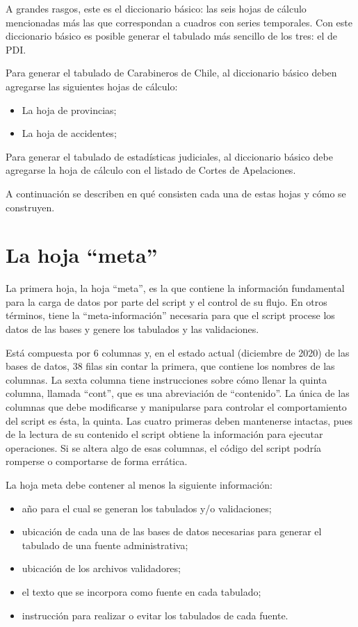 \documentclass[
  spanish,
]{book}
\begin{document}
A grandes rasgos, este es el diccionario básico: las seis hojas de cálculo mencionadas más las que correspondan a cuadros con series temporales. Con este diccionario básico es posible generar el tabulado más sencillo de los tres: el de PDI.

Para generar el tabulado de Carabineros de Chile, al diccionario básico deben agregarse las siguientes hojas de cálculo:

\begin{itemize}
\item
  La hoja de provincias;
\item
  La hoja de accidentes;
\end{itemize}

Para generar el tabulado de estadísticas judiciales, al diccionario básico debe agregarse la hoja de cálculo con el listado de Cortes de Apelaciones.

A continuación se describen en qué consisten cada una de estas hojas y cómo se construyen.

\hypertarget{la-hoja-meta}{%
\section{La hoja ``meta''}\label{la-hoja-meta}}

La primera hoja, la hoja ``meta'', es la que contiene la información fundamental para la carga de datos por parte del script y el control de su flujo. En otros términos, tiene la ``meta-información'' necesaria para que el script procese los datos de las bases y genere los tabulados y las validaciones.

Está compuesta por 6 columnas y, en el estado actual (diciembre de 2020) de las bases de datos, 38 filas sin contar la primera, que contiene los nombres de las columnas. La sexta columna tiene instrucciones sobre cómo llenar la quinta columna, llamada ``cont'', que es una abreviación de ``contenido''. La única de las columnas que debe modificarse y manipularse para controlar el comportamiento del script es ésta, la quinta. Las cuatro primeras deben mantenerse intactas, pues de la lectura de su contenido el script obtiene la información para ejecutar operaciones. Si se altera algo de esas columnas, el código del script podría romperse o comportarse de forma errática.

La hoja meta debe contener al menos la siguiente información:

\begin{itemize}
\item
  año para el cual se generan los tabulados y/o validaciones;
\item
  ubicación de cada una de las bases de datos necesarias para generar el tabulado de una fuente administrativa;
\item
  ubicación de los archivos validadores;
\item
  el texto que se incorpora como fuente en cada tabulado;
\item
  instrucción para realizar o evitar los tabulados de cada fuente.
\end{itemize}
\end{document}
